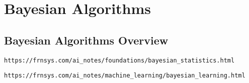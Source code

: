 

\part{Bayesian Algorithms}

\chapter{Bayesian Algorithms Overview}
\label{chap:BayesianAlgoOverview}


\lstinline{https://frnsys.com/ai_notes/foundations/bayesian_statistics.html}

\lstinline{https://frnsys.com/ai_notes/machine_learning/bayesian_learning.html}
